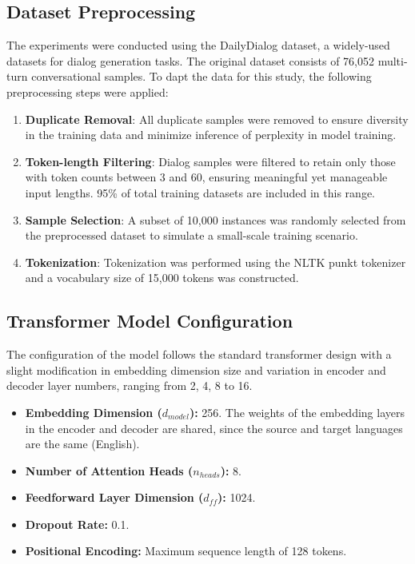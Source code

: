 \documentclass[11pt]{article}
\begin{document}
\subsection{Dataset Preprocessing}
The experiments were conducted using the DailyDialog dataset, a widely-used datasets for dialog generation tasks. The original dataset consists of 76,052 multi-turn conversational samples. To dapt the data for this study, the following preprocessing steps were applied:
    \begin{enumerate}
        \item \textbf{Duplicate Removal}: All duplicate samples were removed to ensure diversity in the training data and minimize inference of perplexity in model training.
        \item \textbf{Token-length Filtering}: Dialog samples were filtered to retain only those with token counts between 3 and 60, ensuring meaningful yet manageable input lengths. 95\% of total training datasets are included in this range.
        \item \textbf{Sample Selection}: A subset of 10,000 instances was randomly selected from the preprocessed dataset to simulate a small-scale training scenario.
        \item \textbf{Tokenization}: Tokenization was performed using the NLTK punkt tokenizer and a vocabulary size of 15,000 tokens was constructed.
    \end{enumerate}

\subsection{Transformer Model Configuration}
The configuration of the model follows the standard transformer design with a slight modification in embedding dimension size and variation in encoder and decoder layer numbers, ranging from 2, 4, 8 to 16. 
\begin{itemize}
    \item \textbf{Embedding Dimension ($d_{model}$):} 256. The weights of the embedding layers in the encoder and decoder are shared, since the source and target languages are the same (English).
    \item \textbf{Number of Attention Heads ($n_{heads}$):} 8.
    \item \textbf{Feedforward Layer Dimension ($d_{ff}$):} 1024.
    \item \textbf{Dropout Rate:} 0.1.
    \item \textbf{Positional Encoding:} Maximum sequence length of 128 tokens.
\end{itemize}
\end{document}
